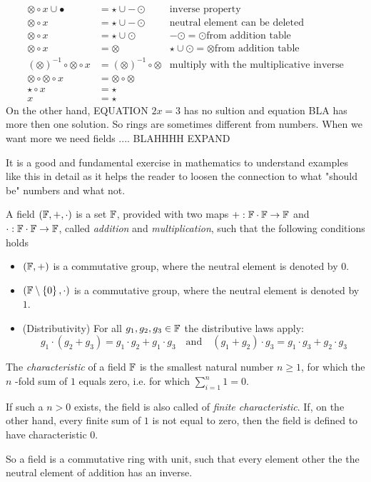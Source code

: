 \begin{example}
\begin{align*}
\otimes \circ x \cup \bullet &= \star \cup -\odot & \text{inverse property}\\
\otimes \circ x &= \star \cup -\odot & \text{neutral element can be deleted} \\
\otimes \circ x &= \star \cup \odot & -\odot = \odot \text{from addition table} \\
\otimes \circ x &= \otimes  & \star \cup \odot = \otimes \text{from addition table}\\
(\otimes)^{-1}\circ \otimes \circ x &= (\otimes)^{-1}\circ \otimes & \text{multiply with the multiplicative inverse}\\
\otimes\circ \otimes \circ x &= \otimes\circ \otimes\\
\star \circ x &= \star\\
x &= \star
\end{align*}
On the other hand, EQUATION $2x=3$ has no sultion and equation BLA has more then one solution. So rings are sometimes different from numbers. When we want more we need fields .... BLAHHHH EXPAND
\end{example}
It is a good and fundamental exercise in mathematics to understand examples like this in detail as it helps the reader to loosen the connection to what "should be" numbers and what not.


\begin{definition}[Field]
A field $ (\mathbb{F}, +, \cdot) $ is a set $ \mathbb{F}$, provided with two maps $ +: \mathbb{F} \cdot \mathbb{F} \to \mathbb{F} $ and $ \cdot: \mathbb{F} \cdot \mathbb{F} \to \mathbb{F} $, called \textit{addition} and \textit{multiplication}, such that the following conditions holds
\begin{itemize}
\item $ \left (\mathbb{F}, + \right) $ is a commutative group, where the neutral element is denoted by $ 0 $.
\item $ \left (\mathbb{F} \setminus \left \{0 \right \}, \cdot \right) $ is a commutative group, where the neutral element is denoted by $ 1 $.
\item (Distributivity) For all $ g_1, g_2, g_3 \in \mathbb{F} $ the distributive laws apply:
$$ g_1 \cdot \left (g_2 + g_3 \right) = g_1 \cdot g_2 + g_1 \cdot g_3 \quad \text{and} \quad
\left (g_1 + g_2 \right) \cdot g_3 = g_1 \cdot g_3 + g_2 \cdot g_3 $$
\end{itemize}
The \textit{characteristic} of a field $ \mathbb{F} $ is the smallest natural number $ n \geq 1 $, for which the $ n $ -fold sum of $ 1 $ equals zero, i.e. for which $ \sum_{i = 1} ^ n 1 = 0 $.

If such a $ n> 0 $ exists, the field is also called of \textit{finite characteristic}. If, on the other hand, every finite sum of $1$ is not equal to zero, then the field is defined to have characteristic $ 0 $.
\end{definition}
So a field is a commutative ring with unit, such that every element other the the neutral element of addition has an inverse.

